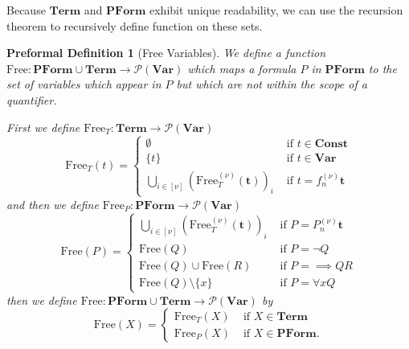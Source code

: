 \documentclass[oneside, 12pt]{book}
\theoremstyle{break}
\newtheorem{preformal definition}[definition]{Preformal Definition}
\newtheorem{preformal theorem}[theorem]{Preformal Theorem}
\newcommand{\bv}[1]{\boldsymbol{#1}}
\newcommand{\mc}[1]{\mathcal{#1}}
\begin{document}
		Because $\textbf{Term}$ and $\textbf{PForm}$ exhibit unique readability, we can use the recursion theorem to recursively define function on these sets.
		
		\begin{preformal definition}[Free Variables]
			We define a function $\text{Free}: \textbf{PForm} \cup \textbf{Term} \to \mc{P}(\textbf{Var})$ which maps a formula $P$ in $\textbf{PForm}$ to the set of variables which appear in $P$ but which are not within the scope of a quantifier.
			
			First we define $\text{Free}_T: \textbf{Term} \to \mc{P}(\textbf{Var})$
			\begin{equation*}
				\text{Free}_T(t) = \begin{cases}
					\emptyset &\text{ if } t \in \textbf{Const}\\					
					\{t\} &\text{ if } t\in \textbf{Var}\\
					\bigcup_{i\in [\nu]} \left(\text{Free}_T^{(\nu)}(\bv{t})\right)_i &\text{ if } t=f_n^{(\nu)}\bv{t}
				\end{cases}
			\end{equation*}
			and then we define $\text{Free}_P: \textbf{PForm} \to \mc{P}(\textbf{Var})$
			\begin{equation*}
				\text{Free}(P) = \begin{cases}
					\bigcup_{i\in [\nu]} \left(\text{Free}_T^{(\nu)}(\bv{t})\right)_i &\text{ if } P = P_n^{(\nu)}\bv{t}\\
					\text{Free}(Q) &\text{ if } P = \lnot Q\\
					\text{Free}(Q) \cup \text{Free}(R) &\text{ if } P = \implies QR\\
					\text{Free}(Q) \setminus \{x\} &\text{ if } P = \forall x Q
				\end{cases}
			\end{equation*}
			then we define $\text{Free}: \textbf{PForm} \cup \textbf{Term} \to \mc{P}(\textbf{Var})$ by
			\begin{equation*}
				\text{Free}(X) = \begin{cases}
					\text{Free}_T(X) &\text{ if } X \in \textbf{Term}\\
					\text{Free}_P(X) &\text{ if } X \in \textbf{PForm}.
				\end{cases}
			\end{equation*}
		\end{preformal definition}
		
\end{document}
